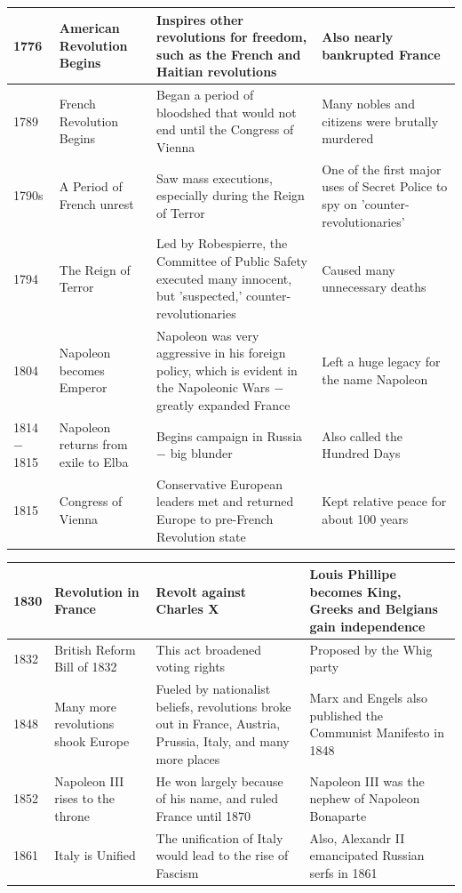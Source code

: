 \documentclass[12pt]{article}
\begin{document}
\begin{enumerate}
\begin{tabular}{|p{}|p{}|p{}|p{}|}
1776 & American Revolution Begins & Inspires other revolutions for freedom, such as the French and Haitian revolutions  & Also nearly bankrupted France \\
\hline
1789 & French Revolution Begins & Began a period of bloodshed that would not end until the Congress of Vienna  & Many nobles and citizens were brutally murdered  \\
\hline
1790s & A Period of French unrest  & Saw mass executions, especially during the Reign of Terror  & One of the first major uses of Secret Police to spy on 'counter-revolutionaries'  \\
\hline
1794 & The Reign of Terror  & Led by Robespierre, the Committee of Public Safety executed many innocent, but 'suspected,' counter-revolutionaries  & Caused many unnecessary deaths  \\
\hline
1804 & Napoleon becomes Emperor & Napoleon was very aggressive in his foreign policy, which is evident in the Napoleonic Wars $-$ greatly expanded France  & Left a huge legacy for the name Napoleon  \\
\hline
1814$-$1815 & Napoleon returns from exile to Elba & Begins campaign in Russia $-$ big blunder & Also called the Hundred Days \\
\hline
1815 & Congress of Vienna & Conservative European leaders met and returned Europe to pre-French Revolution state  & Kept relative peace for about 100 years  \\
\hline
\end{tabular}
\newpage
\hspace{-25pt}\begin{tabular}{|p{}|p{}|p{}|p{}|}
\hline
1830 & Revolution in France & Revolt against Charles X  & Louis Phillipe becomes King, Greeks and Belgians gain independence  \\
\hline
1832 & British Reform Bill of 1832  & This act broadened voting rights  & Proposed by the Whig party  \\
\hline
1848 & Many more revolutions shook Europe & Fueled by nationalist beliefs, revolutions broke out in France, Austria, Prussia, Italy, and many more places  & Marx and Engels also published the Communist Manifesto in 1848 \\
\hline
1852 & Napoleon III rises to the throne  & He won largely because of his name, and ruled France until 1870  & Napoleon III was the nephew of Napoleon Bonaparte  \\
\hline
1861 & Italy is Unified  & The unification of Italy would lead to the rise of Fascism  & Also, Alexandr II emancipated Russian serfs in 1861  \\

\end{tabular}
\end{enumerate}
\end{document}
